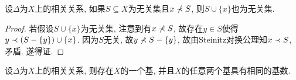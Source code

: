 \begin{proposition}\label{prop:dependlemma}
    设$\Delta$为$X$上的相关关系, 如果$S\subseteq X$为无关集且$x\nprec S$, 则$S\cup\{x\}$也为无关集.
\end{proposition}

\begin{proof}
    若假设$S\cup\{x\}$为无关集, 注意到有$x\nprec S$, 故存在$y\in S$使得$y\prec (S-\{y\})\cup \{x\}$. 因为$S$无关, 故$y\nprec S-\{y\}$, 故由Steinitz对换公理知$x\prec S$, 矛盾. 遂得证.
\end{proof}

\begin{theorem}\label{thm:dependbase}
    设$\Delta$为$X$上的相关关系, 则存在$X$的一个基, 并且$X$的任意两个基具有相同的基数.
\end{theorem}

